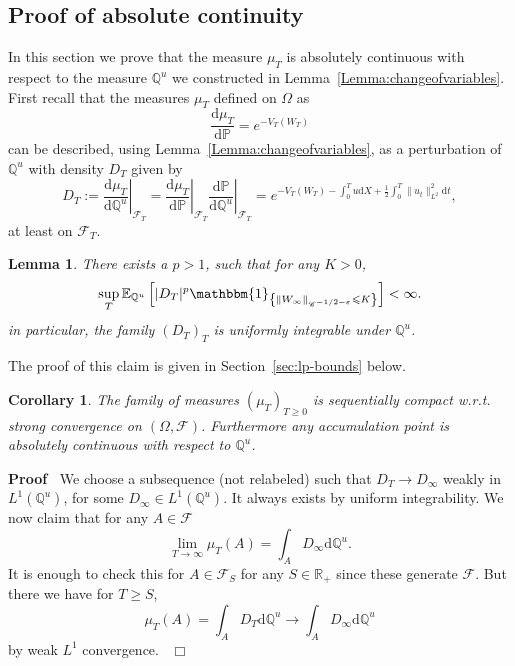 \documentclass[11pt]{article}
\newcommand{\assign}{:=}
\newcommand{\mathd}{\mathrm{d}}
\newenvironment{proof}{\noindent\textbf{Proof\ }}{\hspace*{\fill}$\Box$\medskip}
\newtheorem{corollary}{Corollary}
\newtheorem{lemma}{Lemma}
\newcommand{\VV}{\mathscr{C}}
\newcommand{\CF}{\mathscr{F}}
\begin{document}
\subsection{Proof of absolute continuity}

In this section we prove that the measure $\mu_T$ is absolutely continuous
with respect to the measure $\mathbb{Q}^u$ we constructed in
Lemma~\ref{Lemma:changeofvariables}. First recall that the measures $\mu_T$
defined on $\Omega$ as
\[ \frac{\mathd \mu_T}{\mathd \mathbb{P}} = e^{- V_T (W_T)} \]
can be described, using Lemma~\ref{Lemma:changeofvariables}, as a perturbation
of $\mathbb{Q}^u$ with density $D_T$ given by
\[ D_T \assign \left. \frac{\mathd \mu_T}{\mathd \mathbb{Q}^u} \right|_{\CF_T}
   = \left. \frac{\mathd \mu_T}{\mathd \mathbb{P}} \right|_{\CF_T} \left.
   \frac{\mathd \mathbb{P}}{\mathd \mathbb{Q}^u} \right|_{\CF_T} = e^{- V_T
   (W_T) - \int^T_0 u \mathd X + \frac{1}{2} \int^T_0 \| u_t \|^2_{L^2} \mathd
   t}, \]
at least on $\CF_T$.

\begin{lemma}
  \label{lemma:localestimate}There exists a $p > 1$, such that for any $K >
  0$,
  \[ \sup_T \mathbb{E}_{\mathbb{Q}^u} \left[ | D_T |^p \mathbbm{1}_{\left\{ \|
     W_{\infty} \|_{\VV^{- 1 / 2 - \varepsilon}} \leqslant K \right\}} \right]
     < \infty . \]
  in particular, the family $(D_T)_T$ is uniformly integrable under
  $\mathbb{Q}^u$.
\end{lemma}

The proof of this claim is given in Section~\ref{sec:lp-bounds} below.

\begin{corollary}
  The family of measures $(\mu_T)_{T \geqslant 0}$ is sequentially compact
  w.r.t. strong convergence on $\left( \Omega, \CF \right)$. Furthermore any
  accumulation point is absolutely continuous with respect to $\mathbb{Q}^u$.
\end{corollary}

\begin{proof}
  We choose a subsequence (not relabeled) such that $D_T \rightarrow
  D_{\infty}$ weakly in $L^1 (\mathbb{Q}^u)$, for some $D_{\infty} \in L^1
  (\mathbb{Q}^u)$. It always exists by uniform integrability. We now claim
  that for any $A \in \CF$
  \[ \lim_{T \rightarrow \infty} \mu_T (A) = \int_A D_{\infty} \mathd
     \mathbb{Q}^u . \]
  It is enough to check this for $A \in \CF_S$ for any $S \in \mathbb{R}_+$
  since these generate $\CF$. But there we have for $T \geqslant S$,
  \[ \mu_T (A) = \int_A D_T \mathd \mathbb{Q}^u \rightarrow \int_A
     D_{\infty} \mathd \mathbb{Q}^u \]
  by weak $L^1$ convergence. \ 
\end{proof}
\end{document}
